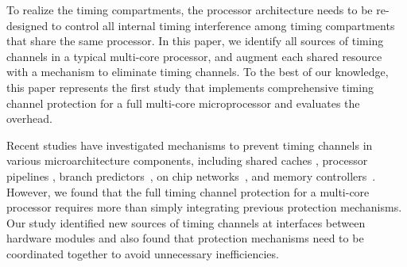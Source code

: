 To realize the timing compartments, the processor architecture needs to be
re-designed to control all internal timing interference among timing
compartments that share the same processor. 
In this paper, we identify all sources of timing channels in a typical
multi-core processor, and augment each shared resource with a mechanism
to eliminate timing channels.
To the best of our knowledge, this paper represents the first study
that implements comprehensive timing channel protection for a full 
multi-core microprocessor and evaluates the overhead.

Recent studies have investigated mechanisms to prevent
timing channels in various microarchitecture components, including
shared caches \cite{icache,newcache,deconstructing,cachegames}, processor pipelines 
\cite{pipelines}, branch predictors~\cite{branchpred,predictingbranch}, on chip 
networks~\cite{yaonocs}, and memory controllers~\cite{ushpca14}.
However, we found that the full timing channel protection for a multi-core
processor requires more than simply integrating previous protection 
mechanisms. Our study identified new sources of timing channels at
interfaces between hardware modules and also found that protection
mechanisms need to be coordinated together to avoid unnecessary inefficiencies.



